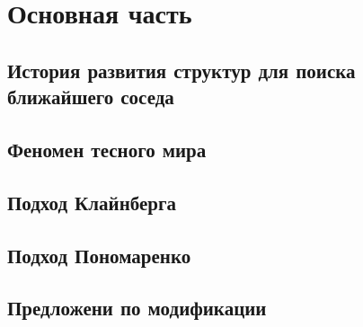 \newpage
\section{Основная часть}

\subsection{История развития структур для поиска ближайшего соседа}

\subsection{Феномен тесного мира}

\subsection{Подход Клайнберга}

\subsection{Подход Пономаренко}

\subsection{Предложени по модификации}